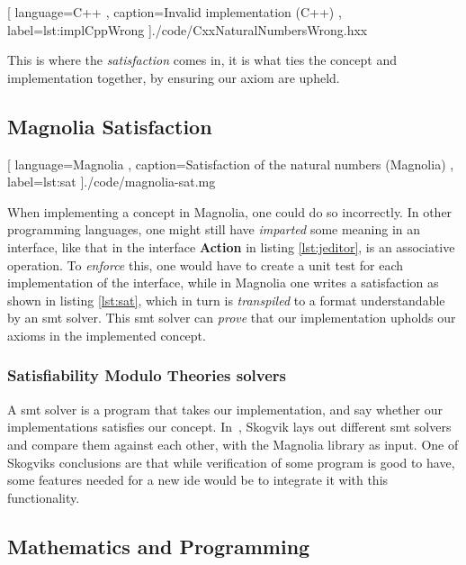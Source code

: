 \begin{code}[H]
  
    [ language=C++
    , caption={Invalid implementation (C++)}
    , label=lst:implCppWrong
    ]{./code/CxxNaturalNumbersWrong.hxx}
\end{code}

This is where the
\textit{satisfaction} comes in, it is what ties the concept and implementation
together, by ensuring our axiom are upheld.

\subsection{Magnolia Satisfaction}

\begin{center}
  
    [ language=Magnolia
    , caption={Satisfaction of the natural numbers (Magnolia)}
    , label=lst:sat
    ]{./code/magnolia-sat.mg}
\end{center}

When implementing a concept in Magnolia, one could do so incorrectly. In other
programming languages, one might still have \textit{imparted} some meaning in an
interface, like that in the interface \textbf{Action} in listing
\ref{lst:jeditor}, is an associative operation. To \textit{enforce} this, one
would have to create a unit test for each implementation of the interface, while
in Magnolia one writes a satisfaction as shown in listing \ref{lst:sat}, which
in turn is \textit{transpiled} to a format understandable by an \gls*{smt}
solver. This \gls*{smt} solver can \textit{prove} that our implementation upholds
our axioms in the implemented concept.

\subsubsection{Satisfiability Modulo Theories solvers}

A \gls*{smt} solver is a program that takes our implementation, and say whether
our implementations satisfies our concept. In~\cite{beateVerification}, Skogvik
lays out different \gls*{smt} solvers and compare them against each other, with
the Magnolia library as input. One of Skogviks conclusions are that while
verification of some program is good to have, some features needed for a new
\gls*{ide} would be to integrate it with this functionality.


\subsection{Mathematics and Programming}

